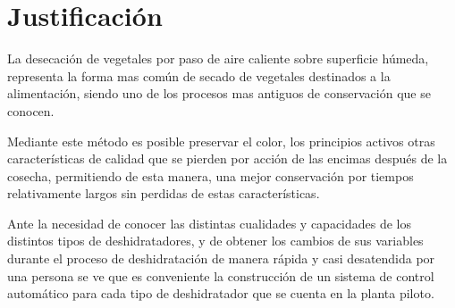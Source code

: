 \section{Justificación}
La desecación de vegetales por paso de aire caliente sobre superficie húmeda,
representa la forma mas común de secado de vegetales destinados a la
alimentación, siendo uno de los procesos mas antiguos de conservación que se
conocen.

Mediante este método es posible preservar el color, los principios activos otras
características de calidad que se pierden por acción de las encimas después de
la cosecha, permitiendo de esta manera, una mejor conservación por tiempos
relativamente largos sin perdidas de estas características.

Ante la necesidad de conocer las distintas cualidades y capacidades de los
distintos tipos de deshidratadores, y de obtener los cambios de sus variables
durante el proceso de deshidratación de manera rápida y casi desatendida por una
persona se ve que es conveniente la construcción de un sistema de control
automático para cada tipo de deshidratador que se cuenta en la planta piloto.


